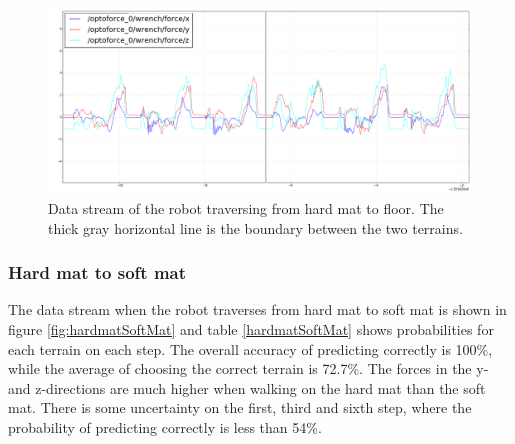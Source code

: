\documentclass[USenglish]{ifimaster}  %
\begin{document}
\begin{figure}[h]
	\centering
	\includegraphics[width=\textwidth,height=\textheight,keepaspectratio]{Figures/MB3_3_Gulvet_line2}
	\caption[Data stream of the transition from hard mat to floor]{Data stream of the robot traversing from hard mat to floor. The thick gray horizontal line is the boundary between the two terrains.}
	\label{fig:mb3Gulvet}
\end{figure}
	
	
\begin{table}[h]
	\centering
	\caption[Results of transistion from hard mat to floor]{Estimated probability of each terrain per step walking from hard mat to floor. Values are marked green to represent correct predictions. For incorrect predictions, the actual value is marked yellow while the predicted value is marked red.}
	\label{tab:mb3Gulvet}
\end{table}
\FloatBarrier
\clearpage

\subsubsection{Hard mat to soft mat} \label{sec:hmssm}
 The data stream when the robot traverses from hard mat to soft mat is shown in figure \ref{fig:hardmatSoftMat} and table \ref{hardmatSoftMat} shows probabilities for each terrain on each step. The overall accuracy of predicting correctly is 100\%, while the average of choosing the correct terrain is 72.7\%. The forces in the y- and z-directions are much higher when walking on the hard mat than the soft mat. There is some uncertainty on the first, third and sixth step, where the probability of predicting correctly is less than 54\%.
\end{document}
